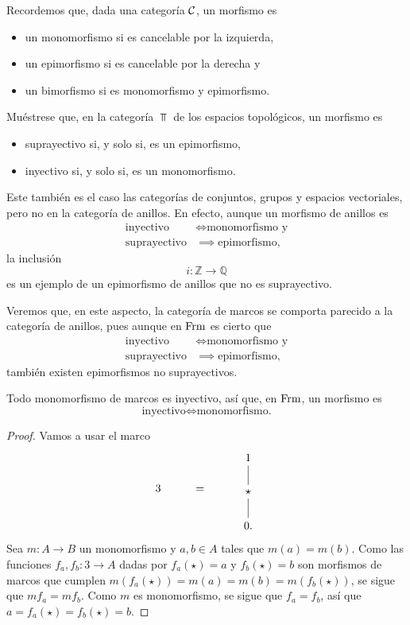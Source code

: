 Recordemos que, dada una categoría $\cal C$, un morfismo es
\begin{itemize}
    \item un monomorfismo si es cancelable por la izquierda,
    \item un epimorfismo si es cancelable por la derecha y
    \item un bimorfismo si es monomorfismo y epimorfismo.
\end{itemize}

\begin{exe}%
    Muéstrese que, en la categoría $\Top$ de los espacios topológicos,
    un morfismo es
    \begin{itemize}
        \item suprayectivo si, y solo si, es un epimorfismo,
        \item inyectivo si, y solo si, es un monomorfismo.
    \end{itemize}
\end{exe}

Este también es el caso las categorías de conjuntos, grupos y
espacios vectoriales, pero no en la categoría de anillos.
En efecto, aunque un morfismo de anillos es
\begin{align*}
    \text{inyectivo} &\iff \text{monomorfismo y} \\
    \text{suprayectivo} &\implies \text{epimorfismo},
\end{align*}
la inclusión
\[
    i:\mathbb Z\to\mathbb Q
\]
es un ejemplo de un epimorfismo de anillos que no es suprayectivo.

Veremos que, en este aspecto, la categoría de marcos se comporta
parecido a la categoría de anillos, pues aunque en $\Frm$ es cierto que
\begin{align*}
    \text{inyectivo} &\iff \text{monomorfismo y} \\
    \text{suprayectivo} &\implies \text{epimorfismo},
\end{align*}
también existen epimorfismos no suprayectivos.

\begin{lemma}
    Todo monomorfismo de marcos es inyectivo,
    así que, en $\Frm$, un morfismo es
    \[
        \text{inyectivo} \iff \text{monomorfismo.}
    \]
\end{lemma}
\begin{proof}
    Vamos a usar el marco
    \[
        3 \hspace{10mm} = \hspace{10mm}
        \begin{tikzcd}
            1 \\ \star \ar[u,no head] \\ 0. \ar[u,no head]
        \end{tikzcd}
    \]
    Sea $m:A\to B$ un monomorfismo y $a,b\in A$ tales que $m(a)=m(b)$.
    Como las funciones $f_a,f_b:3\to A$ dadas por
    $f_a(\star)=a$ y $f_b(\star)=b$ son morfismos de marcos que cumplen
    $m(f_a(\star))=m(a)=m(b)=m(f_b(\star))$, se sigue que $mf_a=mf_b$.
    Como $m$ es monomorfismo, se sigue que $f_a=f_b$, así que
    $a=f_a(\star)=f_b(\star)=b$.
\end{proof}

